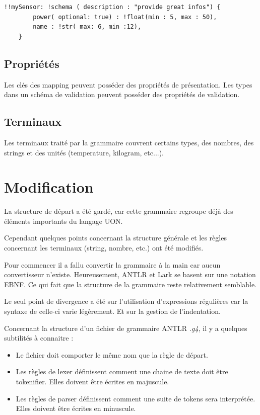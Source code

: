 \documentclass[
    iict, %
    il, %
]{heig-tb}
\begin{document}
\begin{lstlisting}[frame=single,caption={Exemple d'un schéma de validation},captionpos=b,label={schema}]
    !!mySensor: !schema ( description : "provide great infos") {
        power( optional: true) : !float(min : 5, max : 50),
        name : !str( max: 6, min :12),
    }
\end{lstlisting}

\subsection{Propriétés}
Les clés des mapping peuvent posséder des propriétés de présentation.
Les types dans un schéma de validation peuvent posséder des propriétés de validation.

\subsection{Terminaux}
Les terminaux traité par la grammaire couvrent certains types, des nombres, des strings et des unités (temperature, kilogram, etc...).

\section{Modification}\label{modification}

La structure de départ a été gardé, car cette grammaire regroupe déjà des éléments importants du langage UON.

Cependant quelques points concernant la structure générale et les règles concernant les terminaux (string, nombre, etc.) ont été modifiés.

Pour commencer il a fallu convertir la grammaire à la main car aucun convertisseur n'existe. Heureusement, ANTLR et Lark se basent sur une notation EBNF.
Ce qui fait que la structure de la grammaire reste relativement semblable.

Le seul point de divergence a été sur l'utilisation d'expressions régulières car la syntaxe de celle-ci varie légèrement. Et sur la gestion de l'indentation.

Concernant la structure d'un fichier de grammaire ANTLR \emph{.g4}, il y a quelques subtilités à connaitre :

\begin{itemize}
    \item Le fichier doit comporter le même nom que la règle de départ.
    \item Les règles de lexer définissent comment une chaine de texte doit être tokenifier. Elles doivent être écrites en majuscule.
    \item Les règles de parser définissent comment une suite de tokens sera interprétée. Elles doivent être écrites en minuscule.
\end{itemize}
\end{document}
